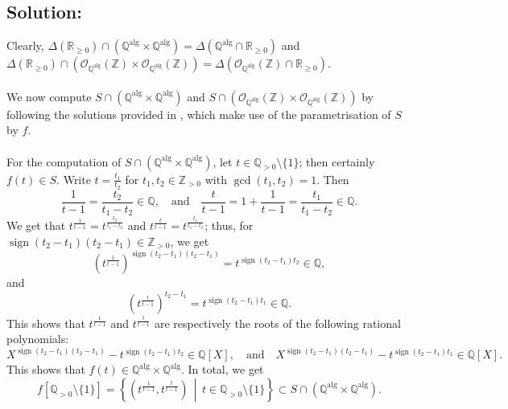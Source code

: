 \documentclass[11pt, a4paper, oneside]{article}
\newcommand{\solution}[1][]{\subsection*{#1}\hfill \par}
\theoremstyle{remark}
\theoremstyle{lemma}
\begin{document}
\solution[Solution:]
Clearly, \( \Delta\left( \mathbb{R}_{\geq 0} \right) \cap \left( \mathbb{Q}^{\mathrm{alg}} \times \mathbb{Q}^{\mathrm{alg}} \right) = \Delta\left( \mathbb{Q}^{\mathrm{alg}} \cap \mathbb{R}_{\geq 0} \right) \)  
and  
\( \Delta\left( \mathbb{R}_{\geq 0} \right) \cap \left( \mathcal{O}_{\mathbb{Q}^{\mathrm{alg}}}(\mathbb{Z}) \times \mathcal{O}_{\mathbb{Q}^{\mathrm{alg}}}(\mathbb{Z}) \right) = \Delta\left( \mathcal{O}_{\mathbb{Q}^{\mathrm{alg}}}(\mathbb{Z}) \cap \mathbb{R}_{\geq 0} \right) \).
\\\\
We now compute \( S \cap \left( \mathbb{Q}^{\mathrm{alg}} \times \mathbb{Q}^{\mathrm{alg}} \right) \) and \( S \cap \left( \mathcal{O}_{\mathbb{Q}^{\mathrm{alg}}}(\mathbb{Z}) \times \mathcal{O}_{\mathbb{Q}^{\mathrm{alg}}}(\mathbb{Z}) \right) \) by following the solutions provided in \cite{sato1972algebraic}, which make use of the parametrisation of \( S \) by \( f \).
\\\\
For the computation of \( S \cap \left( \mathbb{Q}^{\mathrm{alg}} \times \mathbb{Q}^{\mathrm{alg}} \right) \), let \( t \in \mathbb{Q}_{>0} \setminus \{1\} \); then certainly \( f(t) \in S \). Write \( t = \frac{t_1}{t_2} \) for \( t_1, t_2 \in \mathbb{Z}_{>0} \) with \( \gcd(t_1, t_2) = 1 \). Then
\[
\frac{1}{t - 1} = \frac{t_2}{t_1 - t_2} \in \mathbb{Q}, \quad \text{and} \quad \frac{t}{t - 1} = 1 + \frac{1}{t - 1} = \frac{t_1}{t_1 - t_2} \in \mathbb{Q}.
\]
We get that \( t^{\frac{1}{t - 1}} = t^{\frac{t_2}{t_1 - t_2}} \) and \( t^{\frac{t}{t - 1}} = t^{\frac{t_1}{t_1 - t_2}} \); thus, for \( \operatorname{sign}(t_2 - t_1)(t_2 - t_1) \in \mathbb{Z}_{>0} \), we get
\[
\left( t^{\frac{1}{t - 1}} \right)^{\operatorname{sign}(t_2 - t_1)(t_2 - t_1)} = t^{\operatorname{sign}(t_2 - t_1)t_2} \in \mathbb{Q},
\]
and
\[
\left( t^{\frac{t}{t - 1}} \right)^{t_2 - t_1} = t^{\operatorname{sign}(t_2 - t_1)t_1} \in \mathbb{Q}.
\]
This shows that \( t^{\frac{1}{t - 1}} \) and \( t^{\frac{t}{t - 1}} \) are respectively the roots of the following rational polynomials:
\[
X^{\operatorname{sign}(t_2 - t_1)(t_2 - t_1)} - t^{\operatorname{sign}(t_2 - t_1)t_2} \in \mathbb{Q}[X], \quad \text{and} \quad X^{\operatorname{sign}(t_2 - t_1)(t_2 - t_1)} - t^{\operatorname{sign}(t_2 - t_1)t_1} \in \mathbb{Q}[X].
\]
This shows that \( f(t) \in \mathbb{Q}^{\mathrm{alg}} \times \mathbb{Q}^{\mathrm{alg}} \). In total, we get
\[
f\left[ \mathbb{Q}_{>0} \setminus \{1\} \right] = \left\{ \left( t^{\frac{1}{t - 1}}, t^{\frac{t}{t - 1}} \right) \,\middle|\, t \in \mathbb{Q}_{>0} \setminus \{1\} \right\} \subset S \cap \left( \mathbb{Q}^{\mathrm{alg}} \times \mathbb{Q}^{\mathrm{alg}} \right).
\]
\end{document}
